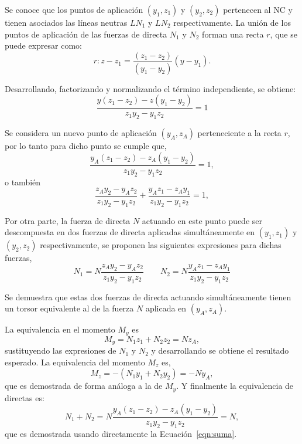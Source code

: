Se conoce que los puntos de aplicación $(y_1,z_1)$ y $(y_2,z_2)$ pertenecen al NC y tienen asociados las líneas neutras $LN_1$ y $LN_2$ respectivamente. La unión de los puntos de aplicación de las fuerzas de directa $N_1$ y $N_2$ forman una recta $r$, que se puede expresar como:
%
$$
r: z-z_1 = \frac{(z_1-z_2)}{(y_1-y_2)}(y-y_1).
$$

Desarrollando, factorizando y normalizando el término independiente, se obtiene:
%
\begin{equation}
\frac{y(z_1-z_2)-z(y_1-y_2)}{z_1y_2-y_1z_2}=1
\end{equation}

Se considera un nuevo punto de aplicación $(y_A,z_A)$ perteneciente a la recta $r$, por lo tanto para dicho punto se cumple que,
\begin{equation}
\frac{y_A(z_1-z_2)-z_A(y_1-y_2)}{z_1y_2-y_1z_2}=1,
\end{equation}
o también
\begin{equation}\label{eqn:suma}
\frac{ z_A y_2 - y_A z_2}{z_1y_2-y_1z_2} +
\frac{ y_A z_1 - z_A y_1}{z_1y_2-y_1z_2} =1,
\end{equation}

Por otra parte, la fuerza de directa $N$ actuando en este punto puede ser descompuesta en dos fuerzas de directa aplicadas simultáneamente en $(y_1,z_1)$ y $(y_2,z_2)$ respectivamente, se proponen las siguientes expresiones para dichas fuerzas,
%
\begin{equation}
N_1=N\frac{z_Ay_2-y_Az_2}{z_1y_2-y_1z_2}
\qquad
N_2=N\frac{y_Az_1-z_Ay_1}{z_1y_2-y_1z_2}
\end{equation}

Se demuestra que estas dos fuerzas de directa actuando simultáneamente tienen un torsor equivalente al de la fuerza $N$ aplicada en $(y_A,z_A)$.
%

La equivalencia en el momento $M_y$ es
\begin{equation}
M_y=N_1z_1+N_2z_2=Nz_A,
\end{equation}
%
sustituyendo las expresiones de $N_1$ y $N_2$ y desarrollando se obtiene el resultado esperado.
%
La equivalencia del momento $M_z$ es,
%
\begin{equation}
M_z=-(N_1y_1+N_2y_2)=-Ny_A,
\end{equation}
%
que es demostrada de forma análoga a la de $M_y$.
Y finalmente la  equivalencia de directas es:
\begin{equation}
N_1+N_2=N\frac{y_A(z_1-z_2)-z_A(y_1-y_2)}{z_1y_2-y_1z_2}=N,
\end{equation}
%
que es demostrada usando directamente la Ecuación~\ref{eqn:suma}.

